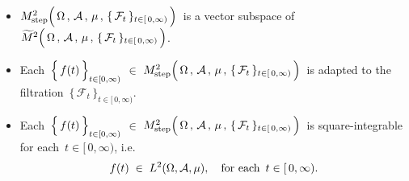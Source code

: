 
\vskip 0.5cm
\begin{remark}
\mbox{}
\vskip 0.2cm
\begin{itemize}
\item
	$M^{2}_{\textnormal{step}}\!
	\left(\,
		\overset{{\color{white}.}}{\Omega} \,,\, \mathcal{A} \,,\, \mu \,,\, \{\,\mathcal{F}_{t}\,\}_{t \in [\,0,\infty)}
		\,\right)$\,
	is a vector subspace of
	\;$\widetilde{M}^{2}\!
	\left(\,
		\overset{{\color{white}.}}{\Omega} \,,\, \mathcal{A} \,,\, \mu \,,\, \{\,\mathcal{F}_{t}\,\}_{t \in [\,0,\infty)}
		\,\right)$.
\item
	Each
	\,$\left\{\,\overset{{\color{white}.}}{f}(t)\,\right\}_{t\in[0,\infty)}$
	$\in$
	$M^{2}_{\textnormal{step}}\!
	\left(\,
		\overset{{\color{white}.}}{\Omega} \,,\, \mathcal{A} \,,\, \mu \,,\, \{\,\mathcal{F}_{t}\,\}_{t \in [\,0,\infty)}
		\,\right)$\,
	is adapted to the filtration
	\,$\{\,\mathcal{F}_{t}\,\}_{t \in [\,0,\infty)}$.
\item
	Each
	\,$\left\{\,\overset{{\color{white}.}}{f}(t)\,\right\}_{t\in[0,\infty)}$
	$\in$
	$M^{2}_{\textnormal{step}}\!
	\left(\,
		\overset{{\color{white}.}}{\Omega} \,,\, \mathcal{A} \,,\, \mu \,,\, \{\,\mathcal{F}_{t}\,\}_{t \in [\,0,\infty)}
		\,\right)$\,
	is square-integrable for each \,$t \in [\,0,\infty)$, i.e.
	\begin{equation*}
	f(t) \; \in \; L^{2}(\Omega,\mathcal{A},\mu),
	\quad
	\textnormal{for each \,$t \in [\,0,\infty)$.}
	\end{equation*}
\end{itemize}
\end{remark}


